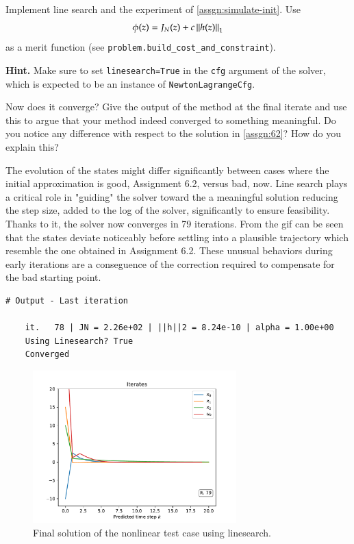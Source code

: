 \documentclass[]{article}
\begin{document}
\begin{assignment}
   Implement line search and the experiment of \cref{assgn:simulate-init}. 
   Use 
	\[ 
		\phi(z) = J_N(z) + c \left\|h(z)\right\|_1 
	\]
	as a merit function (see \texttt{problem.build\_cost\_and\_constraint}). 

	\textbf{Hint.} Make sure to set \texttt{linesearch=True} in the \texttt{cfg} argument of the solver, 
	which is expected to be an instance of \texttt{NewtonLagrangeCfg}.
	
   Now does it converge? Give the output of the method at the final iterate and use this 
   to argue that your method indeed converged to something meaningful. 
   Do you notice any difference with respect to the solution in \cref{assgn:62}? 
   How do you explain this?
\end{assignment}
\begin{flushleft}
	The evolution of the states might differ significantly between cases where the initial approximation is good, Assignment 6.2, versus bad, now.  
	Line search plays a critical role in "guiding" the solver toward the a meaningful solution reducing the step size, added to the log of the solver, significantly to ensure feasibility. Thanks to it, the solver now converges in 79 iterations.
	From the gif can be seen that the states deviate noticeably before settling into a plausible trajectory which resemble the one obtained in Assignment 6.2.
	These unusual behaviors during early iterations are a conseguence of the correction required to compensate for the bad starting point.
\end{flushleft}
\begin{lstlisting}[style=python]
	# Output - Last iteration

	it.   78 | JN = 2.26e+02 | ||h||2 = 8.24e-10 | alpha = 1.00e+00
	Using Linesearch? True
	Converged
\end{lstlisting}
\begin{figure}[H]
	\centering
	\includegraphics[width=0.7\textwidth]{images/Assignment6-4.pdf}
	\caption{Final solution of the nonlinear test case using linesearch.}
	\label{fig:assignment6_4}
\end{figure}
\end{document}
